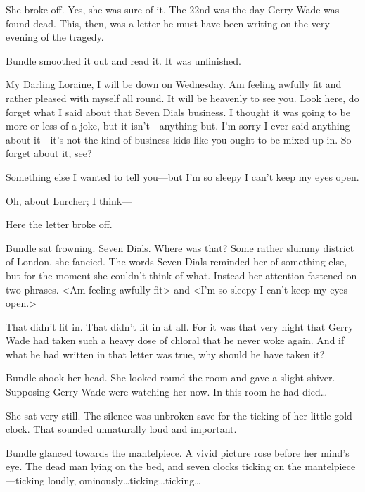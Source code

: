She broke off. Yes, she was sure of it. The 22nd was the day Gerry Wade was found dead. This, then, was a letter he must have been writing on the very evening of the tragedy.

Bundle smoothed it out and read it. It was unfinished.

\begin{mail}{}{My Darling Loraine,}
I will be down on Wednesday. Am feeling awfully fit and rather pleased with myself all round. It will be heavenly to see you. Look here, do forget what I said about that Seven Dials business. I thought it was going to be more or less of a joke, but it isn't—anything but. I'm sorry I ever said anything about it—it's not the kind of business kids like you ought to be mixed up in. So forget about it, see?

Something else I wanted to tell you—but I'm so sleepy I can't keep my eyes open.

Oh, about Lurcher; I think—
\end{mail}

Here the letter broke off.

Bundle sat frowning. Seven Dials. Where was that? Some rather slummy district of London, she fancied. The words Seven Dials reminded her of something else, but for the moment she couldn't think of what. Instead her attention fastened on two phrases. <Am feeling awfully fit\longdots> and <I'm so sleepy I can't keep my eyes open.>

That didn't fit in. That didn't fit in at all. For it was that very night that Gerry Wade had taken such a heavy dose of chloral that he never woke again. And if what he had written in that letter was true, why should he have taken it?

Bundle shook her head. She looked round the room and gave a slight shiver. Supposing Gerry Wade were watching her now. In this room he had died\dots

She sat very still. The silence was unbroken save for the ticking of her little gold clock. That sounded unnaturally loud and important.

Bundle glanced towards the mantelpiece. A vivid picture rose before her mind's eye. The dead man lying on the bed, and seven clocks ticking on the mantelpiece—ticking loudly, ominously\dots ticking\dots ticking\dots